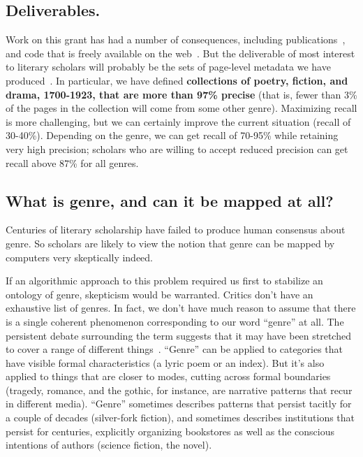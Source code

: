 \documentclass[paper=a4, fontsize=12pt]{scrartcl}
\numberwithin{equation}{section}		%
\numberwithin{figure}{section}			%
\numberwithin{table}{section}				%
\begin{document}
\subsection{Deliverables.}
Work on this grant has had a number of consequences, including publications~\cite{underwood:mutable, underwood:blurry, underwood:slate}, and code that is freely available on the web~\cite{underwood:genrerepo}. But the deliverable of most interest to literary scholars will probably be the sets of page-level metadata we have produced~\cite{underwood:pages}. In particular, we have defined \textbf{collections of poetry, fiction, and drama, 1700-1923, that are more than 97\% precise} (that is, fewer than 3\% of the pages in the collection will come from some other genre). Maximizing recall is more challenging, but we can certainly improve the current situation (recall of 30-40\%). Depending on the genre, we can get recall of 70-95\% while retaining very high precision; scholars who are willing to accept reduced precision can get recall above 87\% for all genres.

\subsection{What is genre, and can it be mapped at all?}
Centuries of literary scholarship have failed to produce human consensus about genre. So scholars are likely to view the notion that genre can be mapped by computers very skeptically indeed.

If an algorithmic approach to this problem required us first to stabilize an ontology of genre, skepticism would be warranted. Critics don't have an exhaustive list of genres. In fact, we don't have much reason to assume that there is a single coherent phenomenon corresponding to our word ``genre'' at all. The persistent debate surrounding the term suggests that it may have been stretched to cover a range of different things~\cite{santini:genre}. ``Genre'' can be applied to categories that have visible formal characteristics (a lyric poem or an index). But it's also applied to things that are closer to modes, cutting across formal boundaries (tragedy, romance, and the gothic, for instance, are narrative patterns that recur in different media). ``Genre'' sometimes describes patterns that persist tacitly for a couple of decades (silver-fork fiction), and sometimes describes institutions that persist for centuries, explicitly organizing bookstores as well as the conscious intentions of authors (science fiction, the novel).
\end{document}
